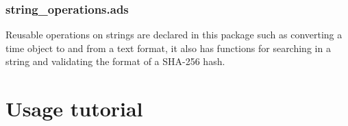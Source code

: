 \documentclass[12pt,a4paper]{article}
\begin{document}
\subsubsection{string\_operations.ads}
Reusable operations on strings are declared in this package such as converting a time object to and from a text format, it also has functions for searching in a string and validating the format of a SHA-256 hash.
\section{Usage tutorial}
\end{document}

